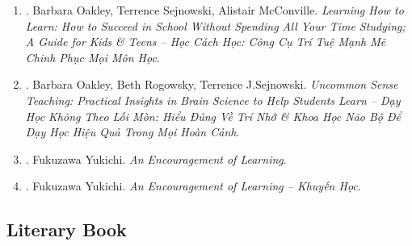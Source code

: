 \documentclass{article}
\begin{document}
\begin{enumerate}
	\item \cite{Oakley_Sejnowski_McConville_learn_how_learn}. Barbara Oakley, Terrence Sejnowski, Alistair McConville. {\it Learning How to Learn: How to Succeed in School Without Spending All Your Time Studying; A Guide for Kids \& Teens -- Học Cách Học: Công Cụ Trí Tuệ Mạnh Mẽ Chinh Phục Mọi Môn Học}.\hfill{\sf[done]}
	
	\item \cite{Oakley_Rogowsky_Sejnowski_McConville_uncommon_sense_teaching}. Barbara Oakley, Beth Rogowsky, Terrence J.Sejnowski. {\it Uncommon Sense Teaching: Practical Insights in Brain Science to Help Students Learn -- Dạy Học Không Theo Lối Mòn: Hiểu Đúng Về Trí Nhớ \& Khoa Học Não Bộ Để Dạy Học Hiệu Quả Trong Mọi Hoàn Cảnh}.\hfill{\sf[done]}
	
	\item \cite{Yukichi_encourage_learn}. {\sc Fukuzawa Yukichi}. {\it An Encouragement of Learning}.\hfill{\sf[reading]}
	
	\item \cite{Yukichi_khuyen_hoc}. {\sc Fukuzawa Yukichi}. {\it An Encouragement of Learning -- Khuyến Học}.\hfill{\sf[done]}
\end{enumerate}


\subsection{Literary Book}
\end{document}

